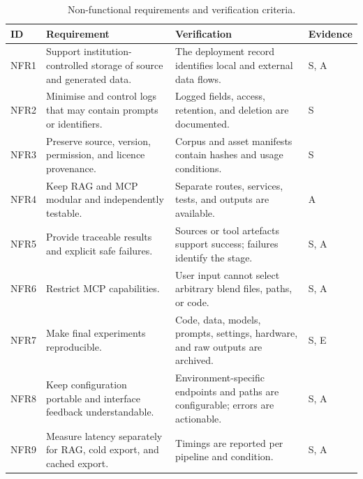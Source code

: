 {\scriptsize
\setlength{\tabcolsep}{3pt}
\renewcommand{\arraystretch}{1.00}
\begin{table}[htbp]
  \centering
  \caption{Non-functional requirements and verification criteria.}
  \label{tab:nonfunctional-requirements}
  \begin{tabularx}{\textwidth}{L{0.08\textwidth} Y Y L{0.11\textwidth}}
    \toprule
    ID & Requirement & Verification & Evidence \\
    \midrule
    NFR1 &
    Support institution-controlled storage of source and generated data. &
    The deployment record identifies local and external data flows. &
    S, A \\

    NFR2 &
    Minimise and control logs that may contain prompts or identifiers. &
    Logged fields, access, retention, and deletion are documented. &
    S \\

    NFR3 &
    Preserve source, version, permission, and licence provenance. &
    Corpus and asset manifests contain hashes and usage conditions. &
    S \\

    NFR4 &
    Keep RAG and MCP modular and independently testable. &
    Separate routes, services, tests, and outputs are available. &
    A \\

    NFR5 &
    Provide traceable results and explicit safe failures. &
    Sources or tool artefacts support success; failures identify the stage. &
    S, A \\

    NFR6 &
    Restrict MCP capabilities. &
    User input cannot select arbitrary blend files, paths, or code. &
    S, A \\

    NFR7 &
    Make final experiments reproducible. &
    Code, data, models, prompts, settings, hardware, and raw outputs are archived. &
    S, E \\

    NFR8 &
    Keep configuration portable and interface feedback understandable. &
    Environment-specific endpoints and paths are configurable; errors are actionable. &
    S, A \\

    NFR9 &
    Measure latency separately for RAG, cold export, and cached export. &
    Timings are reported per pipeline and condition. &
    S, A \\
    \bottomrule
  \end{tabularx}
\end{table}
}

